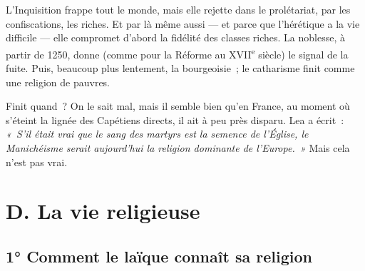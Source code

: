 \documentclass[french,twoside]{book} %
\begin{document}
L’Inquisition frappe tout le monde, mais elle rejette dans le prolétariat, par les confiscations, les riches. Et par là même aussi — et parce que l’hérétique a la vie difficile — elle compromet d’abord la fidélité des classes riches. La noblesse, à partir de 1250, donne (comme pour la Réforme au XVII\textsuperscript{e} siècle) le signal de la fuite. Puis, beaucoup plus lentement, la bourgeoisie ; le catharisme finit comme une religion de pauvres.\par
Finit quand ? On le sait mal, mais il semble bien qu’en France, au moment où s’éteint la lignée des Capétiens directs, il ait à peu près disparu. Lea a écrit : \emph{« S’il était vrai que le sang des martyrs est la semence de l’Église, le Manichéisme serait aujourd’hui la religion dominante de l’Europe. »} Mais cela n’est pas vrai.
\label{p109}\section[{D. La vie religieuse}]{D. La vie religieuse}
\label{c10d}
\subsection[{1° Comment le laïque connaît sa religion}]{1° Comment le laïque connaît sa religion}
\end{document}

